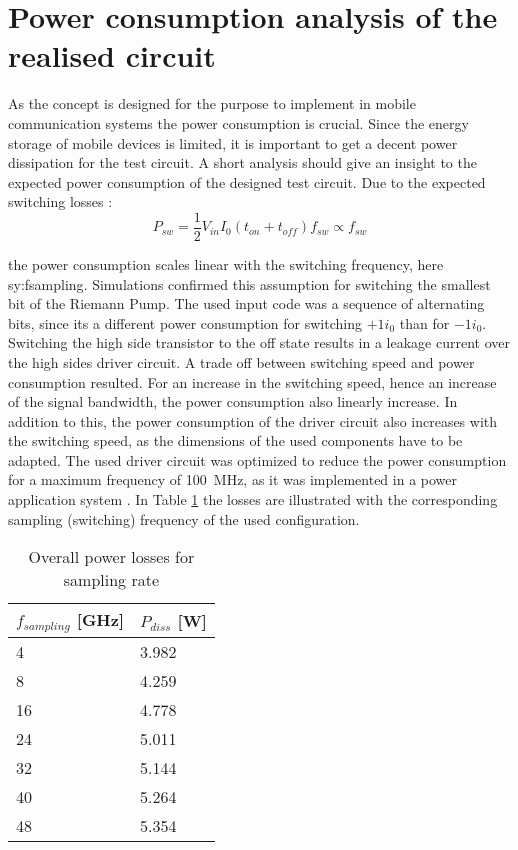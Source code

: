 \section{Power consumption analysis of the realised circuit}
As the concept is designed for the purpose to implement in mobile communication systems the power consumption is crucial.
Since the energy storage of mobile devices is limited, it is important to get a decent power dissipation for the test circuit.
A short analysis should give an insight to the expected power consumption of the designed test circuit.
Due to the expected switching losses \cite{Quay2014}:
\begin{equation}
 P_{sw} = \frac{1}{2} V_{in}I_0(t_{on}+t_{off})f_{sw} \propto f_{sw}
 \label{eq:swtichloss}
\end{equation}

the power consumption scales linear with the switching frequency, here \gls{sy:fsampling}.
Simulations confirmed this assumption for switching the smallest bit of the Riemann Pump.
The used input code was a sequence of alternating bits, since its a different power consumption for switching $+1 i_0$ than for $-1 i_0$.
Switching the high side transistor to the off state results in a leakage current over the high sides driver circuit.
A trade off between switching speed and power consumption resulted.
For an increase in the switching speed, hence an increase of the signal bandwidth, the power consumption also linearly increase.
In addition to this, the power consumption of the driver circuit also increases with the switching speed, as the dimensions of the used components have to be adapted.
The used driver circuit was optimized to reduce the power consumption for a maximum frequency of \SI{100}{\mega \hertz}, as it was implemented in a power application system \cite{MaksimovicPaper}.
In Table \ref{tab:switchloss} the losses are illustrated with the corresponding sampling (switching) frequency of the used configuration.

\begin{table}[ht]
\centering
\begin{tabular}{|l|l|}
\hline
$f_{sampling}$ {[}GHz{]} & $P_{diss}$ {[}W{]} \\ \hline
4                    & 3.982              \\ \hline
8                    & 4.259              \\ \hline
16                   & 4.778              \\ \hline
24                   & 5.011              \\ \hline
32                   & 5.144              \\ \hline
40                   & 5.264              \\ \hline
48                   & 5.354              \\ \hline
\end{tabular}
\caption{Overall power losses for sampling rate}
\label{tab:switchloss}
\end{table}

